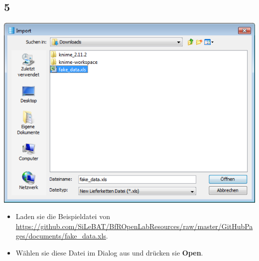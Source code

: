 \documentclass{beamer}
\begin{document}
\subsection{5}
\begin{frame}
	\begin{center}
  		\includegraphics[height=0.6\textheight]{5.png}
	\end{center}
	\begin{itemize}
		\item Laden sie die Beispieldatei von \url{https://github.com/SiLeBAT/BfROpenLabResources/raw/master/GitHubPages/documents/fake_data.xls}.
		\item Wählen sie diese Datei im Dialog aus und drücken sie \textbf{Open}.
	\end{itemize}
\end{frame}
\end{document}
